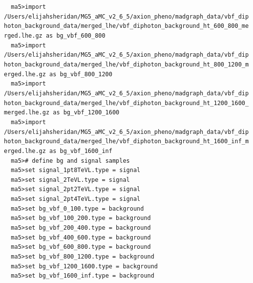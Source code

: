 \documentclass[a4paper, 10pt]{article}
\begin{document}
\texttt{ }\texttt{ }\texttt{ma5>import /\-Users/\-elijahsheridan/\-MG5\_aMC\_v2\_6\_5/\-axion\_pheno/\-madgraph\_data/\-vbf\_diphoton\_background\_data/\-merged\_lhe/\-vbf\_diphoton\_background\_ht\_600\_800\_merged.lhe.gz as bg\_vbf\_600\_800\\
}
\texttt{ }\texttt{ }\texttt{ma5>import /\-Users/\-elijahsheridan/\-MG5\_aMC\_v2\_6\_5/\-axion\_pheno/\-madgraph\_data/\-vbf\_diphoton\_background\_data/\-merged\_lhe/\-vbf\_diphoton\_background\_ht\_800\_1200\_merged.lhe.gz as bg\_vbf\_800\_1200\\
}
\texttt{ }\texttt{ }\texttt{ma5>import /\-Users/\-elijahsheridan/\-MG5\_aMC\_v2\_6\_5/\-axion\_pheno/\-madgraph\_data/\-vbf\_diphoton\_background\_data/\-merged\_lhe/\-vbf\_diphoton\_background\_ht\_1200\_1600\_merged.lhe.gz as bg\_vbf\_1200\_1600\\
}
\texttt{ }\texttt{ }\texttt{ma5>import /\-Users/\-elijahsheridan/\-MG5\_aMC\_v2\_6\_5/\-axion\_pheno/\-madgraph\_data/\-vbf\_diphoton\_background\_data/\-merged\_lhe/\-vbf\_diphoton\_background\_ht\_1600\_inf\_merged.lhe.gz as bg\_vbf\_1600\_inf\\
}
\texttt{ }\texttt{ }\texttt{ma5>\# define bg and signal samples\\
}
\texttt{ }\texttt{ }\texttt{ma5>set signal\_1pt8TeVL.type = signal\\
}
\texttt{ }\texttt{ }\texttt{ma5>set signal\_2TeVL.type = signal\\
}
\texttt{ }\texttt{ }\texttt{ma5>set signal\_2pt2TeVL.type = signal\\
}
\texttt{ }\texttt{ }\texttt{ma5>set signal\_2pt4TeVL.type = signal\\
}
\texttt{ }\texttt{ }\texttt{ma5>set bg\_vbf\_0\_100.type = background\\
}
\texttt{ }\texttt{ }\texttt{ma5>set bg\_vbf\_100\_200.type = background\\
}
\texttt{ }\texttt{ }\texttt{ma5>set bg\_vbf\_200\_400.type  = background\\
}
\texttt{ }\texttt{ }\texttt{ma5>set bg\_vbf\_400\_600.type  = background\\
}
\texttt{ }\texttt{ }\texttt{ma5>set bg\_vbf\_600\_800.type  = background\\
}
\texttt{ }\texttt{ }\texttt{ma5>set bg\_vbf\_800\_1200.type  = background\\
}
\texttt{ }\texttt{ }\texttt{ma5>set bg\_vbf\_1200\_1600.type  = background\\
}
\texttt{ }\texttt{ }\texttt{ma5>set bg\_vbf\_1600\_inf.type = background\\
}
\end{document}
